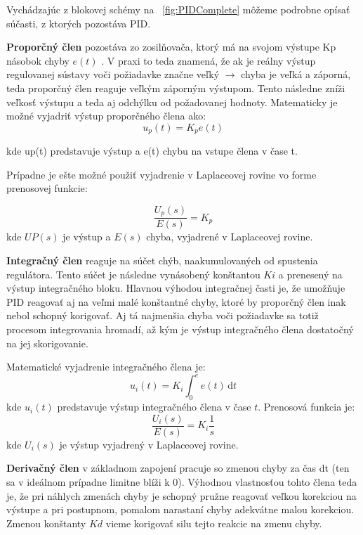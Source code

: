 Vychádzajúc z blokovej schémy na \figurename~\ref{fig:PIDComplete} môžeme podrobne opísať súčasti, z ktorých pozostáva \ac{PID}.

\textbf {Proporčný člen} pozostáva zo zosilňovača, ktorý má na svojom výstupe Kp násobok chyby $e(t)$ . V praxi to teda znamená, že ak je reálny výstup regulovanej sústavy voči požiadavke značne veľký $\rightarrow$ chyba je veľká a záporná, teda proporčný člen reaguje veľkým záporným výstupom. Tento následne zníži veľkosť výstupu a teda aj odchýlku od požadovanej hodnoty. Matematicky je možné vyjadriť výstup proporčného člena ako:
\begin{equation}
u_p (t)= K_p e( t )
\end{equation}

kde up(t) predstavuje výstup a e(t) chybu na vstupe člena v čase t. 

Prípadne je ešte možné použiť vyjadrenie v Laplaceovej rovine vo forme prenosovej funkcie:

\begin{equation}
\dfrac {U_p(s)} {E(s)} = K_p 
\end{equation}
kde $UP(s)$ je výstup a $E(s)$ chyba, vyjadrené v Laplaceovej rovine.

\textbf{Integračný člen} reaguje na súčet chýb, naakumulovaných od spustenia regulátora. Tento súčet je následne vynásobený konštantou $Ki$ a prenesený na výstup integračného bloku. Hlavnou výhodou integračnej časti je, že umožňuje \ac{PID} reagovať aj na veľmi malé konštantné chyby, ktoré by proporčný člen inak nebol schopný korigovať. Aj tá najmenšia chyba voči požiadavke sa totiž procesom integrovania hromadí, až kým je výstup integračného člena dostatočný na jej skorigovanie. 

Matematické vyjadrenie integračného člena je:
\begin{equation}
u_i (t)= K_i \int_0^e \! e( t ) \, \mathrm{d}t 
\end{equation}
kde $u_i(t)$ predstavuje výstup integračného člena v čase $t$. 
Prenosová funkcia je:
\begin{equation}
\dfrac{U_i(s)}{E(s)}  = K_i\dfrac{ 1}{s} 
\end{equation}
kde $U_i (s)$ je výstup vyjadrený v Laplaceovej rovine.

\textbf{Derivačný člen} v základnom zapojení pracuje so zmenou chyby za čas dt (ten sa v ideálnom prípadne limitne blíži k 0). Výhodnou vlastnosťou tohto člena teda je, že pri náhlych zmenách chyby je schopný pružne reagovať veľkou korekciou na výstupe a pri postupnom, pomalom narastaní chyby adekvátne malou korekciou. Zmenou konštanty $Kd$ vieme korigovať silu tejto reakcie na zmenu chyby.

